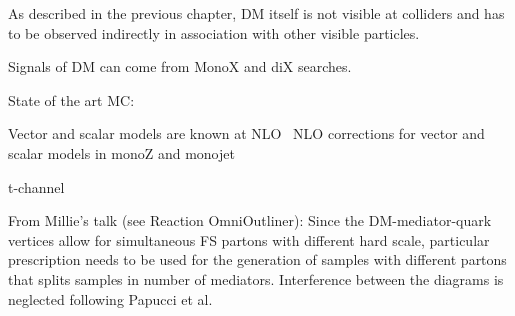 As described in the previous chapter, DM itself is not visible at colliders and has
to be observed indirectly in association with other visible particles. 

Signals of DM can come from MonoX and diX searches. 

State of the art MC:

Vector and scalar models are known at NLO~\cite{Neubert:2015fka,Haisch:2013ata}
NLO corrections for vector and scalar models in monoZ and monojet

t-channel

From Millie's talk (see Reaction OmniOutliner):
Since the DM-mediator-quark vertices allow for simultaneous FS partons with different hard scale, particular prescription needs to be used for the generation of samples with different partons that splits samples in number of mediators. Interference between the diagrams is neglected following Papucci et al. 
